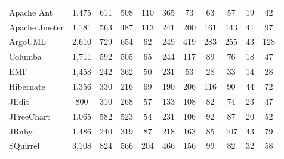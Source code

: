 \begin{table}[h]
\begin{minipage}{\textwidth}
\begin{center}
\begin{tabular}{l| c c c c c c c c c c}
        Apache Ant     & 1,475 & 611 & 508 & 110 & 365 & 73  & 63  & 57  & 19 & 42    \\
        Apache Jmeter  & 1,181 & 563 & 487 & 113 & 241 & 200 & 161 & 143 & 41 & 97    \\
        ArgoUML        & 2,610 & 729 & 654 & 62  & 249 & 419 & 283 & 255 & 43 & 128   \\
        Columba        & 1,711 & 592 & 505 & 65  & 244 & 117 & 89  & 76  & 18 & 47    \\
        EMF            & 1,458 & 242 & 362 & 50  & 231 & 53  & 28  & 33  & 14 & 28    \\
        Hibernate      & 1,356 & 330 & 216 & 69  & 190 & 206 & 116 & 90  & 44 & 72    \\
        JEdit          & 800   & 310 & 268 & 57  & 133 & 108 & 82  & 74  & 23 & 47    \\
        JFreeChart     & 1,065 & 582 & 523 & 54  & 231 & 106 & 92  & 87  & 20 & 52    \\
        JRuby          & 1,486 & 240 & 319 & 87  & 218 & 163 & 85  & 107 & 43 & 79    \\
        SQuirrel       & 3,108 & 824 & 566 & 204 & 466 & 156 & 99  & 82  & 32 & 58    \\
                       

        \bottomrule
        \end{tabular}
    \end{center}
  \end{minipage}    
\end{table} 


